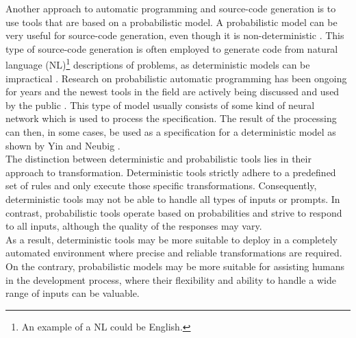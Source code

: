 Another approach to automatic programming and source-code generation is to use tools that are based on a probabilistic model.
A probabilistic model can be very useful for source-code generation, even though it is non-deterministic \cite{chenEvaluatingLargeLanguage2021}.
This type of source-code generation is often employed to generate code from natural language (NL)\footnote{
    An example of a NL could be English.
}
descriptions of problems, as deterministic models can be impractical \cite{alonStructuralLanguageModels2020}.
Research on probabilistic automatic programming has been ongoing for years and the newest tools in the field are actively being discussed and used by the public \cite{zdnetWhatChatGPTWhy, johnmaedaChoosingLLMModel2023}.
This type of model usually consists of some kind of neural network which is used to process the specification. 
The result of the processing can then, in some cases, be used as a specification for a deterministic model as shown by Yin and Neubig \cite{yinSyntacticNeuralModel2017}.\\
The distinction between deterministic and probabilistic tools lies in their approach to transformation. Deterministic tools strictly adhere to a predefined set of rules and only execute those specific transformations. Consequently, deterministic tools may not be able to handle all types of inputs or prompts.
In contrast, probabilistic tools operate based on probabilities and strive to respond to all inputs, although the quality of the responses may vary.\\
As a result, deterministic tools may be more suitable to deploy in a completely automated environment where precise and reliable transformations are required.
On the contrary, probabilistic models may be more suitable for assisting humans in the development process, where their flexibility and ability to handle a wide range of inputs can be valuable.